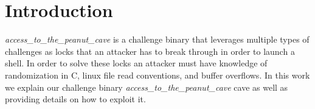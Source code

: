 \section{Introduction}
\emph{access\_to\_the\_peanut\_cave} is a challenge binary that leverages multiple types of challenges as locks that an attacker has to break through in order to launch a shell. In order to solve these locks an attacker must have knowledge of randomization in C, linux file read conventions, and buffer overflows. In this work we explain our challenge binary \emph{access\_to\_the\_peanut\_cave} cave as well as providing details on how to exploit it. 
